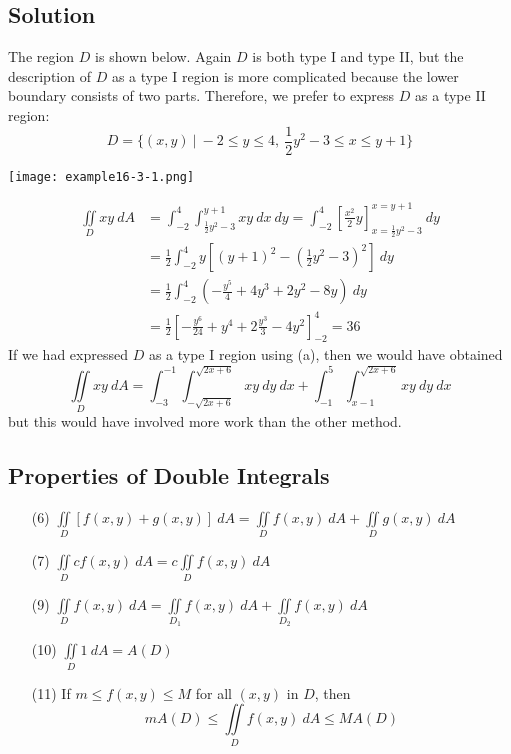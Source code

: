 \subsection*{Solution}
The region $D$ is shown below. Again $D$ is both type I and type II, but the description of $D$ as a type I region is
more complicated because the lower boundary consists of two parts. Therefore, we prefer
to express $D$ as a type II region:
$$D=\{(x,y)\:|\:-2\leq y\leq 4,\: \frac{1}{2}y^2-3\leq x\leq y+1\}$$
\begin{center}
    \texttt{[image: example16-3-1.png]}
\end{center}
\begin{align*}
    \iint\limits_D xy\:dA & =\int_{-2}^4\int_{\frac{1}{2}y^2-3}^{y+1}xy\:dx\:dy=\int_{-2}^4\left[\frac{x^2}{2}y\right]_{x=\frac{1}{2}y^2-3}^{x=y+1}\:dy \\
                          & =\frac{1}{2}\int_{-2}^4 y[(y+1)^2-(\frac{1}{2}y^2-3)^2]\:dy                                                                 \\
                          & =\frac{1}{2}\int_{-2}^4 \left(-\frac{y^5}{4}+4y^3+2y^2-8y\right)\:dy                                                        \\
                          & =\frac{1}{2}\left[-\frac{y^6}{24}+y^4+2\frac{y^3}{3}-4y^2\right]_{-2}^4=36
\end{align*}
If we had expressed $D$ as a type I region using (a), then we would have obtained
$$\iint\limits_D xy\: dA=\int_{-3}^{-1}\int_{-\sqrt{2x+6}}^{\sqrt{2x+6}} xy\:dy\:dx+
    \int_{-1}^5\int_{x-1}^{\sqrt{2x+6}} xy\:dy\:dx$$
but this would have involved more work than the other method.

\subsection*{Properties of Double Integrals}
\begin{enumerate}
    \item[(6)] $\iint\limits_D [f(x,y)+g(x,y)]\:dA=\iint\limits_D f(x,y)\:dA+\iint\limits_D g(x,y)\:dA$
    \item[(7)] $\iint\limits_D cf(x,y)\:dA=c\iint\limits_D f(x,y)\:dA$
    \item[(9)] $\iint\limits_D f(x,y)\:dA=\iint\limits_{D_1} f(x,y)\:dA+\iint\limits_{D_2} f(x,y)\:dA$
    \item[(10)] $\iint\limits_D 1\:dA=A(D)$
    \item[(11)] If $m\leq f(x,y)\leq M$ for all $(x,y)$ in $D$, then $$mA(D)\leq\iint\limits_D f(x,y)\:dA\leq MA(D)$$
\end{enumerate}


